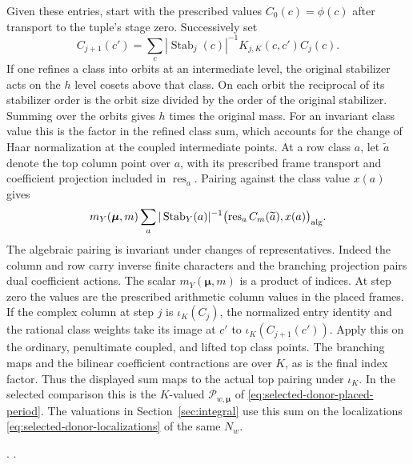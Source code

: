 Given these entries, start with the prescribed values
\(C_0(c)=\phi(c)\) after transport to the tuple's stage zero.
Successively set
\[
 C_{j+1}(c')=\sum_c |\operatorname{Stab}_j(c)|^{-1}
                                     K_{j,K}(c,c')C_j(c).
\]
If one refines a class into orbits at an intermediate level, the
original stabilizer acts on the \(h\) level cosets above that
class. On each orbit the reciprocal of its stabilizer order is
the orbit size divided by the order of the original stabilizer.
Summing over the orbits gives \(h\) times the original mass.
For an invariant class value this is the factor in the refined
class sum, which accounts for the change of Haar normalization
at the coupled intermediate points.
At a row class \(a\), let \(\widetilde a\) denote the top column
point over \(a\), with its prescribed frame transport and coefficient
projection included in \(\operatorname{res}_a\). Pairing against
the class value \(x(a)\) gives
\[
 m_Y(\boldsymbol\mu,m)
   \sum_a |\operatorname{Stab}_Y(a)|^{-1}
      \bigl(\operatorname{res}_a C_m(\widetilde a),x(a)\bigr)_{\rm alg}.
\]
The algebraic pairing is invariant under changes of representatives.
Indeed the column and row carry inverse finite characters and the
branching projection pairs dual coefficient actions. The scalar
\(m_Y(\boldsymbol\mu,m)\) is a product of indices.
At step zero the values are the prescribed arithmetic column
values in the placed frames. If the complex column at step \(j\)
is \(\iota_K(C_j)\), the normalized entry identity and the rational
class weights take its image at \(c'\) to
\(\iota_K(C_{j+1}(c'))\). Apply this on the ordinary, penultimate
coupled, and lifted top class points. The branching maps and
the bilinear coefficient contractions are over \(K\), as is
the final index factor. Thus the displayed sum maps to the
actual top pairing under \(\iota_K\).
In the selected comparison this is the \(K\)-valued
\(\mathcal P_{w,\boldsymbol\mu}\) of
\eqref{eq:selected-donor-placed-period}. The valuations in
Section~\ref{sec:integral} use this sum on the localizations
\eqref{eq:selected-donor-localizations} of the same \(N_w\).

.
.

